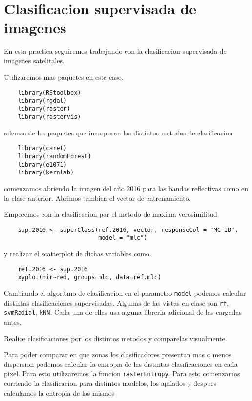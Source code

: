 \documentclass[a4paper]{article}
\begin{document}
\section{Clasificacion supervisada de imagenes}

En esta practica seguiremos trabajando con la clasificacion supervisada de
imagenes satelitales.

Utilizaremos mas paquetes en este caso.

\begin{lstlisting}
    library(RStoolbox)
    library(rgdal)
    library(raster)
    library(rasterVis)
\end{lstlisting}

ademas de los paquetes que incorporan los distintos metodos de clasificacion

\begin{lstlisting}
    library(caret)
    library(randomForest)
    library(e1071)
    library(kernlab)
\end{lstlisting}

comenzamos abriendo la imagen del año 2016 para las bandas reflectivas como en
la clase anterior. Abrimos tambien el vector de entrenamiento.

Empecemos con la clasificacion por el metodo de maxima verosimilitud

\begin{lstlisting}
    sup.2016 <- superClass(ref.2016, vector, responseCol = "MC_ID", 
                           model = "mlc")
\end{lstlisting}

y realizar el scatterplot de dichas variables como.

\begin{lstlisting}
    ref.2016 <- sup.2016
    xyplot(nir~red, groups=mlc, data=ref.mlc)
\end{lstlisting}

Cambiando el algoritmo de clasificacion en el parametro \texttt{model} podemos
calcular distintas clasificaciones supervisadas. Algunas de las vistas en clase
son \texttt{rf}, \texttt{svmRadial}, \texttt{kNN}. Cada una de ellas usa alguna
libreria adicional de las cargadas antes.

\begin{act}
    Realice clasificaciones por los distintos metodos y comparelas visualmente. 
\end{act}

Para poder comparar en que zonas los clasificadores presentan mas o menos
dispersion podemos calcular la entropia de las distintas clasificaciones en cada
pixel. Para esto utilizaremos la funcion \texttt{rasterEntropy}. Para esto
comenzamos corriendo la clasificacion para distintos modelos, los apilados y
despues calculamos la entropia de los mismos
\end{document}
